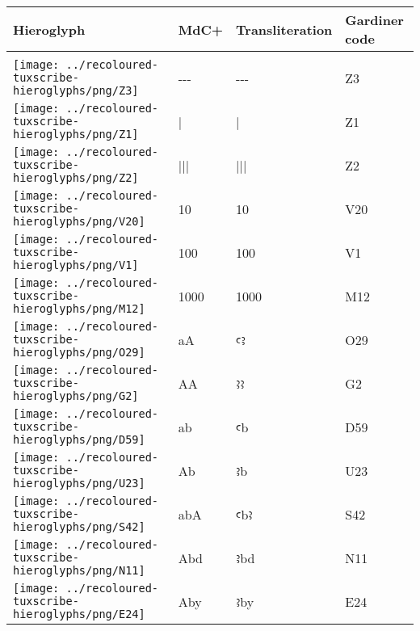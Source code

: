 \begin{center}
	\begin{tabularx}{\linewidth}{YYYY}
		Hieroglyph & MdC+ & Transliteration & Gardiner code\\
		\hline\\
		\texttt{[image: ../recoloured-tuxscribe-hieroglyphs/png/Z3]} & {-}{-}{-} & {-}{-}{-} & Z3 \\ 
		\texttt{[image: ../recoloured-tuxscribe-hieroglyphs/png/Z1]} & | & | & Z1 \\ 
		\texttt{[image: ../recoloured-tuxscribe-hieroglyphs/png/Z2]} & ||| & ||| & Z2 \\ 
		\texttt{[image: ../recoloured-tuxscribe-hieroglyphs/png/V20]} & 10 & 10 & V20 \\ 
		\texttt{[image: ../recoloured-tuxscribe-hieroglyphs/png/V1]} & 100 & 100 & V1 \\ 
		\texttt{[image: ../recoloured-tuxscribe-hieroglyphs/png/M12]} & 1000 & 1000 & M12 \\ 
		\texttt{[image: ../recoloured-tuxscribe-hieroglyphs/png/O29]} & aA & ꜥꜣ & O29 \\ 
		\texttt{[image: ../recoloured-tuxscribe-hieroglyphs/png/G2]} & AA & ꜣꜣ & G2 \\ 
		\texttt{[image: ../recoloured-tuxscribe-hieroglyphs/png/D59]} & ab & ꜥb & D59 \\ 
		\texttt{[image: ../recoloured-tuxscribe-hieroglyphs/png/U23]} & Ab & ꜣb & U23 \\ 
		\texttt{[image: ../recoloured-tuxscribe-hieroglyphs/png/S42]} & abA & ꜥbꜣ & S42 \\ 
		\texttt{[image: ../recoloured-tuxscribe-hieroglyphs/png/N11]} & Abd & ꜣbd & N11 \\ 
		\texttt{[image: ../recoloured-tuxscribe-hieroglyphs/png/E24]} & Aby & ꜣby & E24 \\ 
	\end{tabularx}
\end{center}


